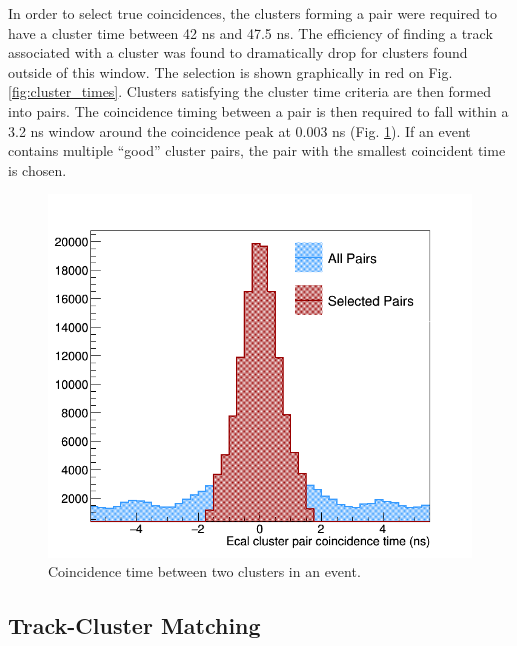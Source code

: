 In order to select true coincidences, the clusters forming a pair were 
required to have a cluster time between 42 ns and 47.5 ns.  The efficiency
of finding a track associated with a cluster was found to dramatically drop 
for clusters found outside of this window.  The selection is
shown graphically in red on Fig. \ref{fig:cluster_times}.  Clusters satisfying
the cluster time criteria are then formed into pairs.  The coincidence timing
between a pair is then required to fall within a 3.2 ns window around the 
coincidence peak at 0.003 ns (Fig. \ref{fig:coin_time}).  If an event contains
multiple ``good'' cluster pairs, the pair with the smallest coincident time is 
chosen. 
\begin{figure}[t]
    \centering
    \includegraphics[width=.9\textwidth]{images/20160428_coincidence_time.png}
    \caption{Coincidence time between two clusters in an event.}
    \label{fig:coin_time}
\end{figure}  
 
\subsection{Track-Cluster Matching}
   

